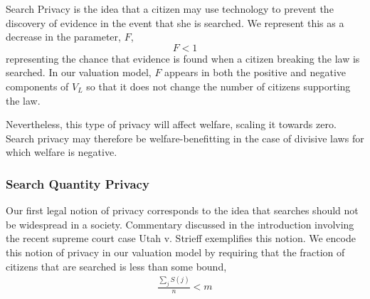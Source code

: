 Search Privacy is the idea that a citizen may use technology to prevent the discovery of evidence in the event that she is searched.  We represent this as a decrease in the parameter, $F$, 
$$F<1$$
representing the chance that evidence is found when a citizen breaking the law is searched.  In our valuation model, $F$ appears in both the positive and negative components of $V_L$ so that it does not change the number of citizens supporting the law. 

Nevertheless, this type of privacy will affect welfare, scaling it towards zero.  Search privacy may therefore be welfare-benefitting in the case of divisive laws for which welfare is negative.

\subsubsection{Search Quantity Privacy}

Our first legal notion of privacy corresponds to the idea that searches should not be widespread in a society.  Commentary discussed in the introduction involving  the recent supreme court case Utah v. Strieff exemplifies this notion.
%
We encode this notion of privacy in our valuation model by requiring that the fraction of citizens that are searched is less than some bound, 
\begin{align}
\frac{\sum_j S(j)}{n} < m
\end{align}

